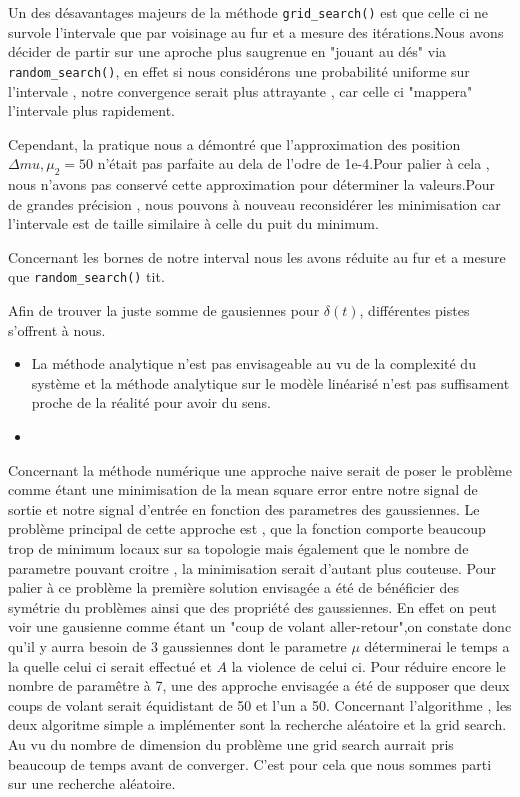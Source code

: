 \documentclass[11pt,a4paper]{article}
\begin{document}
\par Un des désavantages majeurs de la méthode \texttt{grid\_search()} est que celle ci ne survole l'intervale que par voisinage au fur et a mesure des itérations.Nous avons décider de partir sur une aproche plus saugrenue en "jouant au dés" via \texttt{random\_search()}, en effet si nous considérons une probabilité uniforme sur l'intervale , notre convergence serait plus attrayante , car celle ci "mappera" l'intervale plus rapidement.

\par Cependant, la pratique nous a démontré que l'approximation des position $\Delta mu, \mu_2=50$ n'était pas parfaite au dela de l'odre de 1e-4.Pour palier à cela , nous n'avons pas conservé cette approximation pour déterminer la valeurs.Pour de grandes précision , nous pouvons à nouveau reconsidérer les minimisation car l'intervale est de taille similaire à celle du puit du minimum.

\par Concernant les bornes de notre interval nous les avons réduite au fur et a mesure que \texttt{random\_search()} tit.


Afin de trouver la juste somme de gausiennes pour $\delta(t)$, différentes pistes s'offrent à nous.
\begin{itemize}
  \item 
La méthode analytique n'est pas envisageable au vu de la complexité du système et la méthode analytique sur le modèle linéarisé n'est pas suffisament proche de la réalité pour avoir du sens. 
\item 
\end{itemize}
Concernant la méthode numérique une approche naive serait de poser le problème comme étant une minimisation de la mean square error entre notre signal de sortie et notre signal d'entrée en fonction des parametres des gaussiennes. 
Le problème principal de cette approche est , que la fonction comporte beaucoup trop de minimum locaux sur sa topologie mais également que le nombre de parametre pouvant croitre , la minimisation serait d'autant plus couteuse. 
Pour palier à ce problème la première solution envisagée a été de bénéficier des symétrie du problèmes ainsi que des propriété des gaussiennes.
En effet on peut voir une gausienne comme étant un "coup de volant aller-retour",on constate donc qu'il y aurra besoin de 3 gaussiennes dont le parametre $\mu$ déterminerai le temps a la quelle celui ci serait effectué et $A$ la violence de celui ci. 
Pour réduire encore le nombre de paramêtre à 7, une des approche envisagée a été de supposer que deux coups de volant serait équidistant de 50 et l'un a 50. Concernant l'algorithme , les deux algoritme simple a implémenter sont la recherche aléatoire et la grid search. Au vu du nombre de dimension du problème une grid search aurrait pris beaucoup de temps avant de converger. C'est pour cela que nous sommes parti sur une recherche aléatoire. 
\end{document}
